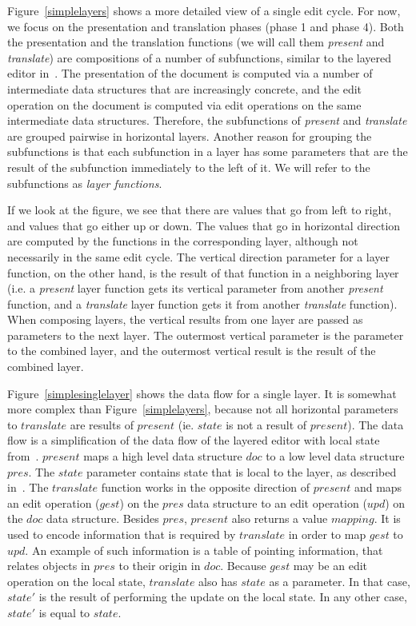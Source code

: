 Figure~\ref{simplelayers} shows a more detailed view of a single edit cycle. For now, we focus on the presentation and translation phases (phase 1 and phase 4). Both the presentation and the translation functions (we will call them {\em present} and {\em translate}) are compositions of a number of subfunctions, similar to the layered editor in~\cite{architecture}. The presentation of the document is computed via a number of intermediate data structures that are increasingly concrete, and the edit operation on the document is computed via edit operations on the same intermediate data structures. Therefore, the subfunctions of {\em present} and {\em translate} are grouped pairwise in horizontal layers. Another reason for grouping the subfunctions is that each subfunction in a layer has some parameters that are the result of the subfunction immediately to the left of it. We will refer to the subfunctions as {\em layer functions}.

If we look at the figure, we see that there are values that go from left to right, and values that go either up or down. The values that go in horizontal direction are computed by the functions in the corresponding layer, although not necessarily in the same edit cycle. The vertical direction parameter for a layer function, on the other hand, is the result of that function in a neighboring layer (i.e. a {\em present} layer function gets its vertical parameter from another {\em present} function, and a {\em translate} layer function gets it from another {\em translate} function). When composing layers, the vertical results from one layer are passed as parameters to the next layer. The outermost vertical parameter is the parameter to the combined layer, and the outermost vertical result is the result of the combined layer. 


Figure~\ref{simplesinglelayer} shows the data flow for a single layer. It is somewhat more complex than Figure~\ref{simplelayers}, because not all horizontal parameters to $translate$ are results of $present$ (ie. $state$ is not a result of $present$). The data flow is a simplification of the data flow of the layered editor with local state from~\cite{architecture}. $present$ maps a high level data structure $doc$ to a low level data structure $pres$. The $state$ parameter contains state that is local to the layer, as described in~\cite{architecture}. The $translate$ function works in the opposite direction of $present$ and maps an edit operation ($gest$) on the $pres$ data structure to an edit operation ($upd$) on the $doc$ data structure. Besides $pres$, $present$ also returns a value $mapping$. It is used to encode information that is required by $translate$ in order to map $gest$ to $upd$. An example of such information is a table of pointing information, that relates objects in $pres$ to their origin in $doc$. Because $gest$ may be an edit operation on the local state, $translate$ also has $state$ as a parameter. In that case, $state'$ is the result of performing the update on the local state. In any other case, $state'$ is equal to $state$. 

